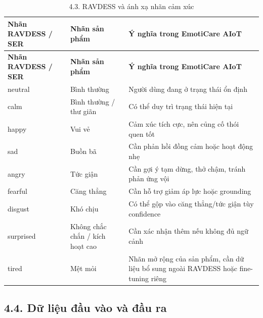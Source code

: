\documentclass[12pt,a4paper]{article}
\begin{document}
\begin{center}
\begin{longtable}{|P{0.25\textwidth}|P{0.32\textwidth}|P{0.33\textwidth}|}
\caption{4.3. RAVDESS và ánh xạ nhãn cảm xúc}\\
\hline
\textbf{Nhãn RAVDESS / SER} & \textbf{Nhãn sản phẩm} & \textbf{Ý nghĩa trong EmotiCare AIoT} \\
\hline
\endfirsthead
\hline
\textbf{Nhãn RAVDESS / SER} & \textbf{Nhãn sản phẩm} & \textbf{Ý nghĩa trong EmotiCare AIoT} \\
\hline
\endhead
neutral & Bình thường & Người dùng đang ở trạng thái ổn định \\
\hline
calm & Bình thường / thư giãn & Có thể duy trì trạng thái hiện tại \\
\hline
happy & Vui vẻ & Cảm xúc tích cực, nên củng cố thói quen tốt \\
\hline
sad & Buồn bã & Cần phản hồi đồng cảm hoặc hoạt động nhẹ \\
\hline
angry & Tức giận & Cần gợi ý tạm dừng, thở chậm, tránh phản ứng vội \\
\hline
fearful & Căng thẳng & Cần hỗ trợ giảm áp lực hoặc grounding \\
\hline
disgust & Khó chịu & Có thể gộp vào căng thẳng/tức giận tùy confidence \\
\hline
surprised & Không chắc chắn / kích hoạt cao & Cần xác nhận thêm nếu không đủ ngữ cảnh \\
\hline
tired & Mệt mỏi & Nhãn mở rộng của sản phẩm, cần dữ liệu bổ sung ngoài RAVDESS hoặc fine-tuning riêng \\
\hline
\end{longtable}
\end{center}

\subsection*{4.4. Dữ liệu đầu vào và đầu ra}
\end{document}
